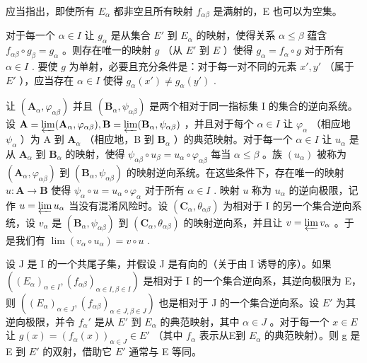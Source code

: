 应当指出，即使所有 \(E_{\alpha}\) 都非空且所有映射 \(f_{\alpha\beta}\) 是满射的，E 也可以为空集。

对于每一个 \(\alpha \in I\) 让 \(g_{\alpha}\) 是从集合 \(E'\) 到 \(E_{\alpha}\) 的映射，使得关系 \(\alpha \leqslant \beta\) 蕴含 \(f_{\alpha \beta} \circ g_{\beta} = g_{\alpha}\) 。则存在唯一的映射 \(g\) （从 \(E'\) 到 \(E\) ）使得 \(g_{\alpha} = f_{\alpha} \circ g\) 对于所有 \(\alpha \in I\) . 要使 \(g\) 为单射，必要且充分条件是：对于每一对不同的元素 \(x', y'\) （属于 \(E'\) ），应当存在 \(\alpha \in I\) 使得 \(g_{\alpha}(x') \neq g_{\alpha}(y')\) .

让 \((\mathbf{A}_{\alpha},\varphi_{\alpha \beta})\) 并且 \((\mathbf{B}_{\alpha},\psi_{\alpha \beta})\) 是两个相对于同一指标集 I 的集合的逆向系统。设 \(\mathbf{A} = \varprojlim (\mathbf{A}_{\alpha},\varphi_{\alpha \beta}),\mathbf{B} = \varprojlim (\mathbf{B}_{\alpha},\psi_{\alpha \beta})\) ，并且对于每个 \(\alpha \in I\) 让 \(\varphi_{\alpha}\) （相应地 \(\psi_{\alpha}\) ）为 A 到 \(\mathbf{A}_{\alpha}\) （相应地，B 到 \(\mathbf{B}_{\alpha}\) ）的典范映射。对于每一个 \(\alpha \in I\) 让 \(u_{\alpha}\) 是从 \(\mathbf{A}_{\alpha}\) 到 \(\mathbf{B}_{\alpha}\) 的映射，使得 \(\psi_{\alpha \beta}\circ u_{\beta} = u_{\alpha}\circ \varphi_{\alpha \beta}\) 每当 \(\alpha \leqslant \beta\) 。族 \((u_{\alpha})\) 被称为 \((\mathbf{A}_{\alpha},\varphi_{\alpha \beta})\) 到 \((\mathbf{B}_{\alpha},\psi_{\alpha \beta})\) 的映射逆向系统。在这些条件下，存在唯一的映射 \(u:\mathbf{A}\to \mathbf{B}\) 使得 \(\psi_{\alpha}\circ u = u_{\alpha}\circ \varphi_{\alpha}\) 对于所有 \(\alpha \in I\) . 映射 \(u\) 称为 \(u_{\alpha}\) 的逆向极限，记作 \(u = \varprojlim u_{\alpha}\) 当没有混淆风险时。设 \((\mathbf{C}_{\alpha}, \theta_{\alpha\beta})\) 为相对于 I 的另一个集合逆向系统，设 \(v_{\alpha}\) 是 \((\mathbf{B}_{\alpha}, \psi_{\alpha\beta})\) 到 \((\mathbf{C}_{\alpha}, \theta_{\alpha\beta})\) 的映射逆向系，并且让 \(v = \varprojlim v_{\alpha}\) 。于是我们有 \(\lim (v_{\alpha} \circ u_{\alpha}) = v \circ u\) .

设 J 是 I 的一个共尾子集，并假设 J 是有向的（关于由 I 诱导的序）。如果 \(((E_{\alpha})_{\alpha\in I}, (f_{\alpha\beta})_{\alpha\in I,\beta\in I})\) 是相对于 I 的一个集合逆向系，其逆向极限为 E，则 \(((E_{\alpha})_{\alpha\in J}, (f_{\alpha\beta})_{\alpha\in J,\beta\in J})\) 也是相对于 J 的一个集合逆向系。设 \(E'\) 为其逆向极限，并令 \(f_{\alpha}'\) 是从 \(E'\) 到 \(E_{\alpha}\) 的典范映射，其中 \(\alpha\in J\) 。对于每一个 \(x\in E\) 让 \(g(x)=(f_{\alpha}(x))_{\alpha\in J}\in E'\) （其中 \(f_{\alpha}\) 表示从E到 \(E_{\alpha}\) 的典范映射）。则 g 是 E 到 \(E'\) 的双射，借助它 \(E'\) 通常与 E 等同。

